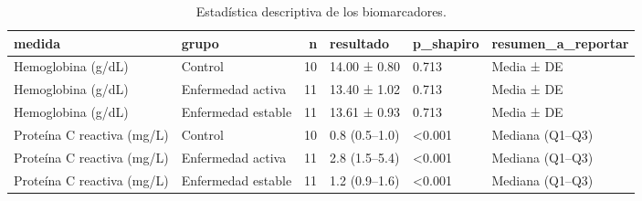 \begin{table}

\caption{Estadística descriptiva de los biomarcadores.}
\centering
\begin{tabular}[t]{llrlll}
\toprule
medida & grupo & n & resultado & p\_shapiro & resumen\_a\_reportar\\
\midrule
Hemoglobina (g/dL) & Control & 10 & 14.00 ± 0.80 & 0.713 & Media ± DE\\
Hemoglobina (g/dL) & Enfermedad activa & 11 & 13.40 ± 1.02 & 0.713 & Media ± DE\\
Hemoglobina (g/dL) & Enfermedad estable & 11 & 13.61 ± 0.93 & 0.713 & Media ± DE\\
Proteína C reactiva (mg/L) & Control & 10 & 0.8 (0.5–1.0) & <0.001 & Mediana (Q1–Q3)\\
Proteína C reactiva (mg/L) & Enfermedad activa & 11 & 2.8 (1.5–5.4) & <0.001 & Mediana (Q1–Q3)\\
\addlinespace
Proteína C reactiva (mg/L) & Enfermedad estable & 11 & 1.2 (0.9–1.6) & <0.001 & Mediana (Q1–Q3)\\
\bottomrule
\end{tabular}
\end{table}
